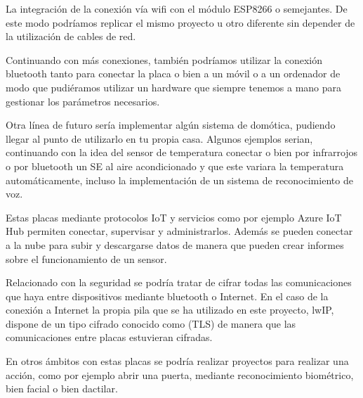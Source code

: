 \begin{description}
\item La integración de la conexión vía wifi con el módulo ESP8266 o semejantes. De este modo podríamos replicar el mismo proyecto u otro diferente sin depender de la utilización de cables de red. 
\item Continuando con más conexiones, también podríamos utilizar la conexión bluetooth tanto para conectar la placa o bien a un móvil o a un ordenador de modo que pudiéramos utilizar un hardware que siempre tenemos a mano para gestionar los parámetros necesarios.
\item Otra línea de futuro sería implementar algún sistema de domótica, pudiendo llegar al punto de utilizarlo en tu propia casa. Algunos ejemplos serian, continuando con la idea del sensor de temperatura conectar o bien por infrarrojos o por bluetooth un SE al aire acondicionado y que este variara la temperatura automáticamente, incluso la implementación de un sistema de reconocimiento de voz.
\item Estas placas mediante protocolos IoT y servicios como por ejemplo Azure IoT Hub permiten conectar, supervisar y administrarlos. Además se pueden conectar a la nube para subir y descargarse datos de manera que pueden crear informes sobre el funcionamiento de un sensor.
\item Relacionado con la seguridad se podría tratar de cifrar todas las comunicaciones que haya entre dispositivos mediante bluetooth o Internet. En el caso de la conexión a Internet la propia pila que se ha utilizado en este proyecto, lwIP, dispone de un tipo cifrado conocido como  (TLS) de manera que las comunicaciones entre placas estuvieran cifradas.
\item En otros ámbitos con estas placas se podría realizar proyectos para realizar una acción, como por ejemplo abrir una puerta, mediante reconocimiento biométrico, bien facial o bien dactilar.
\end{description}
